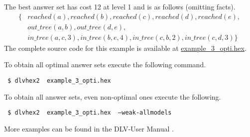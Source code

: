 \documentclass[a4paper, titlepage]{article}
\newcommand{\mi}[1]{\mathit{#1}}
\newcommand{\examplelink}[1]{\url{https://github.com/hexhex/manual/tree/master/#1}}
\newcommand{\exampledownloadlink}[2]{\href{https://github.com/hexhex/manual/raw/master/#1}{#2}}
\newcommand\leftaligned[1]{\par \smallskip \noindent \qquad #1 \smallskip \par}
\begin{document}
\begin{exmp}
The best answer set has cost 12 at level 1 and is as follows
(omitting facts).
\begin{align*}
\{ & \mi{reached(a), reached(b), reached(c), reached(d), reached(e)}, \\
   & \mi{out\_tree(a,b), out\_tree(d,e)}, \\
   & \mi{in\_tree(a,c,3), in\_tree(b,e,4), in\_tree(c,b,2), in\_tree(c,d,3)}\} 
\end{align*}
The complete source code for this example is available at
\exampledownloadlink{example_3_opti/example_3_opti.hex}{example\_3\_opti.hex}.

To obtain all optimal answer sets execute the following command.
\leftaligned{\texttt{ \$ dlvhex2 \ example\_3\_opti.hex}}

To obtain all answer sets, even non-optimal ones execute the following.
%
\leftaligned{\texttt{ \$ dlvhex2 \ example\_3\_opti.hex \ --weak-allmodels}}
\end{exmp}

More examples can be found in the DLV-User Manual \cite{brfwilvpg2009}.
\end{document}
